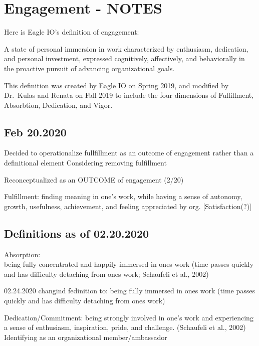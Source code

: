 \documentclass[
]{book}
\begin{document}
\hypertarget{engagement---notes}{%
\chapter{Engagement - NOTES}\label{engagement---notes}}

Here is Eagle IO's definition of engagement:

A state of personal immersion in work characterized by enthusiasm, dedication, and personal investment, expressed cognitively, affectively, and behaviorally in the proactive pursuit of advancing organizational goals.

This definition was created by Eagle IO on Spring 2019, and modified by Dr.~Kulas and Renata on Fall 2019 to include the four dimensions of Fulfillment, Absorbtion, Dedication, and Vigor.

\hypertarget{feb-20.2020}{%
\section{Feb 20.2020}\label{feb-20.2020}}

Decided to operationalize fullfillment as an outcome of engagement rather than a definitional element
Considering removing fulfillment

Reconceptualized as an OUTCOME of engagement (2/20)

Fulfillment: finding meaning in one's work, while having a sense of autonomy, growth, usefulness, achievement, and feeling appreciated by org. {[}Satisfaction(?){]}

\hypertarget{definitions-as-of-02.20.2020}{%
\section{Definitions as of 02.20.2020}\label{definitions-as-of-02.20.2020}}

Absorption:\\
being fully concentrated and happily immersed in ones work (time passes quickly and has difficulty detaching from ones work; Schaufeli et al., 2002)

02.24.2020
changind fedinition to:
being fully immersed in ones work (time passes quickly and has difficulty detaching from ones work)

Dedication/Commitment:
being strongly involved in one's work and experiencing a sense of enthusiasm, inspiration, pride, and challenge. (Schaufeli et al., 2002) Identifying as an organizational member/ambassador
\end{document}
